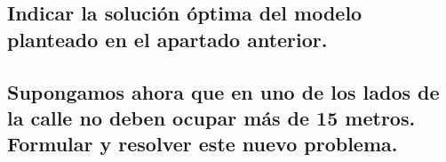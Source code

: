 \documentclass[10pt, a4paper]{article}
\begin{document}
		\subsection{Indicar la solución óptima del modelo planteado en el apartado anterior.}

			\paragraph{}

		\subsection{Supongamos ahora que en uno de los lados de la calle no deben ocupar más de 15 metros. Formular y resolver este nuevo problema.}

			\paragraph{}
\end{document}
